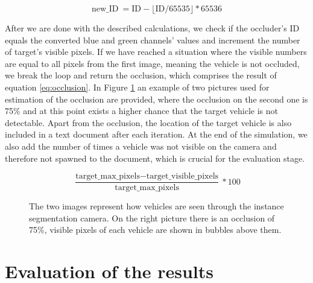 \begin{equation}\textrm{new\_ID} \: = \textrm{ID} - \lfloor \textrm{ID} / 65535 \rfloor * 65536\label{eq:new_id}\end{equation}

After we are done with the described calculations, we check if the occluder's ID equals the converted blue and green channels' values and increment the number of target's visible pixels. If we have reached a situation where the visible numbers are equal to all pixels from the first image, meaning the vehicle is not occluded, we break the loop and return the occlusion, which comprises the result of equation \ref{eq:occlusion}. In Figure \ref{fig:occlusion_calc} an example of two pictures used for estimation of the occlusion are provided, where the occlusion on the second one is 75\% and at this point exists a higher chance that the target vehicle is not detectable. Apart from the occlusion, the location of the target vehicle is also included in a text document after each iteration. At the end of the simulation, we also add the number of times a vehicle was not visible on the camera and therefore not spawned to the document, which is crucial for the evaluation stage.  

\begin{equation}
    \frac{\textrm{target\_max\_pixels} - \textrm{target\_visible\_pixels}}{\textrm{target\_max\_pixels}} * 100 \label{eq:occlusion}
\end{equation}

\begin{figure} [h!]
  \centering
  \hfill
  \caption[Calculation of an occlusion]{The two images represent how vehicles are seen through the instance segmentation camera. On the right picture there is an occlusion of 75\%, visible pixels of each vehicle are shown in bubbles above them.} \label{fig:occlusion_calc}
\end{figure}
 
 \section{Evaluation of the results}